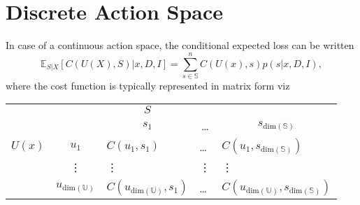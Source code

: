 


\section{Discrete Action Space}
In case of a continuous action space, the conditional expected loss can be written
\begin{equation}
	\mathbb{E}_{S|X}[C(U(X), S)|x,D,I] = \sum_{s\in \mathbb{S}}^nC(U(x),s)p(s|x,D,I),
\end{equation}
where the cost function is typically represented in matrix form viz
\begin{center}
	\begin{tabular}{ c  c  c  c  c  }
		&& $S$& & \\
		&& $s_1$ & \dots & $s_{\text{dim}(\mathbb{S})}$ \\
		\cline{3-5}
		$U(x)$ & $u_1$& \multicolumn{1}{|l}{$C(u_1, s_1)$} &\multicolumn{1}{l}{\dots}&\multicolumn{1}{l|}{$C(u_1, s_{\text{dim}(\mathbb{S})})$} \\
		& \vdots & \multicolumn{1}{|l}{\vdots} &\multicolumn{1}{l}{\vdots}&\multicolumn{1}{l|}{\vdots} \\
		& $u_{\text{dim}(\mathbb{U})}$ & \multicolumn{1}{|l}{$C(u_{\text{dim}(\mathbb{U})}, s_1)$} &\multicolumn{1}{l}{\dots}&\multicolumn{1}{l|}{$C(u_{\text{dim}(\mathbb{U})}, s_{\text{dim}(\mathbb{S})})$} \\
		\cline{3-5}
	\end{tabular}
\end{center}


